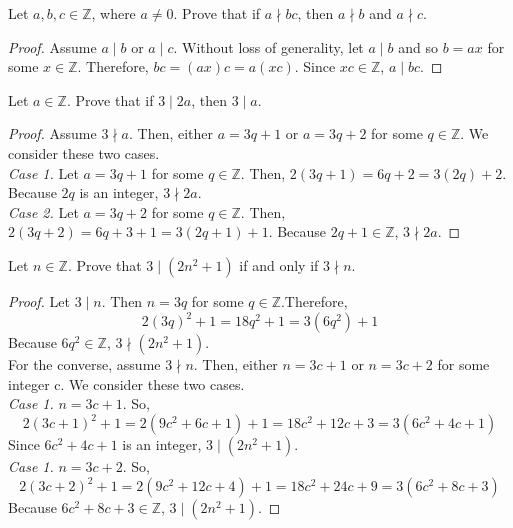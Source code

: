 \documentclass[12pt]{article}
\newcommand{\Z}{\mathbb{Z}}
\newenvironment{problem}[2][Problem]{\begin{trivlist}
		\item[\hskip \labelsep {\bfseries #1}\hskip \labelsep {\bfseries #2.}]}{\end{trivlist}}
\begin{document}
	\begin{problem}{5}
		Let $a,b,c \in \Z$, where $a\neq 0$. Prove that if $a \nmid bc$, then $a\nmid b$ and $a \nmid c$.
		\begin{proof}
			Assume $a\mid b$ or $a \mid c$. Without loss of generality, let $a\mid b$ and so $b=ax$ for some $x\in \Z$. Therefore,
				$bc = (ax)c = a(xc)$. Since $xc \in \Z$, $a \mid bc$.
		\end{proof}
	\end{problem}

	\begin{problem}{6}
		Let $a\in \Z$. Prove that if $3\mid 2a$, then $3\mid a$.
		\begin{proof}
			Assume $3\nmid a$. Then, either $a=3q+1$ or $a=3q+2$ for some $q\in \Z$. We consider these two cases.\\
			\textit{Case 1.} Let $a=3q+1$ for some $q \in \Z$. Then, $2(3q+1)=6q+2=3(2q)+2$. Because $2q$ is an integer, $3\nmid 2a$.\\
			\textit{Case 2.} Let $a=3q+2$ for some $q \in \Z$. Then, $2(3q+2)=6q+3+1=3(2q+1)+1$. Because $2q+1\in \Z$, $3\nmid 2a$.
		\end{proof}
	\end{problem}
	
	\begin{problem}{7}
		Let $n\in \Z$. Prove that $3\mid (2n^{2}+1)$ if and only if $3\nmid n$.
		\begin{proof}
			Let $3\mid n$. Then $n=3q$ for some $q \in\Z$.Therefore,
			\begin{equation*}
				2(3q)^{2}+1=18q^{2}+1=3(6q^{2}) +1
			\end{equation*}
			Because $6q^{2}\in \Z$, $3\nmid (2n^{2}+1)$.\\
			
			For the converse, assume $3\nmid n$. Then, either $n=3c+1$ or $n=3c+2$ for some integer c. We consider these two cases.\\
			\textit{Case 1.} $n=3c+1$. So, 
			\begin{equation*}
				2(3c+1)^{2}+1 = 2(9c^{2}+6c+1)+1=18c^{2}+12c+3 = 3(6c^{2}+4c+1)
			\end{equation*}
		Since $6c^{2}+4c+1$ is an integer, $3\mid (2n^{2}+1)$.\\
			\textit{Case 1.} $n=3c+2$. So, 
			\begin{equation*}
				2(3c+2)^{2}+1 = 2(9c^{2}+12c+4)+1=18c^{2}+24c+9= 3(6c^{2}+8c+3)
			\end{equation*}
		Because $6c^{2}+8c+3\in \Z$, $3\mid (2n^{2}+1)$.
		\end{proof} 
	\end{problem}
\end{document}
